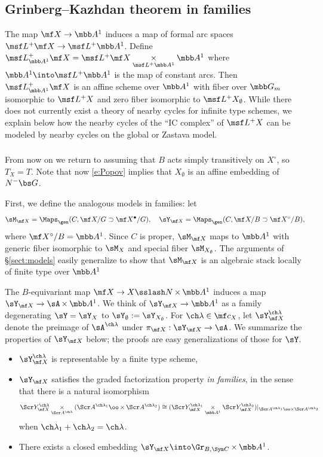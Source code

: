 \documentclass[final]{amsart}
\theoremstyle{remark}
\theoremstyle{definition}
\DeclareMathOperator*{\xt}{\times}
\numberwithin{equation}{section}
\begin{document}
\subsection{Grinberg--Kazhdan theorem in families}
The map $\mf X \to \mbb A^1$ 
induces a map of formal arc spaces $\msf L^+ \mf X \to \msf L^+ \mbb A^1$. Define
$\msf L^+_{\mbb A^1} \mf X = \msf L^+ \mf X \underset{\msf L^+ \mbb A^1}\times \mbb A^1$
where $\mbb A^1 \into \msf L^+ \mbb A^1$ is the map of constant
arcs. Then $\msf L^+_{\mbb A^1} \mf X$ is an affine scheme over $\mbb A^1$
with fiber over $\mbb G_m$ isomorphic to $\msf L^+X$ and zero fiber isomorphic to 
$\msf L^+ X_\emptyset$. 
While there does not currently exist a theory of nearby cycles for infinite type
schemes, we explain below how the nearby cycles of the ``IC complex'' of 
$\msf L^+ X$ can be modeled by nearby cycles on the global or Zastava model. 


\subsubsection{}
From now on we return to assuming that $B$ acts simply transitively on $X^\circ$, 
so $T_X=T$. Note that now \eqref{e:Popov} implies that $X_\emptyset$ is an 
affine embedding of $N^-\bs G$. 

\smallskip


First, we define the analogous models in families: let 
\[ \sM_{\mf X} = \Maps_\gen(C, \mf X/G \supset \mf X^\bullet/G), \quad 
\sY_{\mf X} = \Maps_\gen(C, \mf X/B \supset \mf X^\circ/B), \]
where $\mf X^\circ/B = \mbb A^1$.  
Since $C$ is proper, $\sM_{\mf X}$ maps to $\mbb A^1$ 
with generic fiber isomorphic to $\sM_X$ and special fiber $\sM_{X_\emptyset}$.
The arguments of \S\ref{sect:models} easily generalize to
show that $\sM_{\mf X}$ is an algebraic stack locally of finite type over $\mbb A^1$

The $B$-equivariant map $\mf X \to X\sslash N \xt \mbb A^1$ induces
a map $\sY_{\mf X} \to \sA \xt \mbb A^1$. We think of $\sY_{\mf X}\to \mbb A^1$
as a family degenerating $\sY=\sY_X$ to $\sY_\emptyset := \sY_{X_\emptyset}$. 
For $\ch\lambda\in \mf c_X$, let $\sY_{\mf X}^{\ch\lambda}$
denote the preimage of $\sA^{\ch\lambda}$ under $\pi_{\mf X} : \sY_{\mf X} \to \sA$.
We summarize the properties of $\sY_{\mf X}$ below; the proofs
are easy generalizations of those for $\sY$. 
\begin{itemize}
\item $\sY_{\mf X}^{\ch\lambda}$ is representable by a finite type scheme,
\item $\sY_{\mf X}$ satisfies the graded factorization property \emph{in families},
in the sense that there is a natural isomorphism 
\[ 
\Scr Y_{\mf X}^{\ch\lambda} \underset{\Scr A^{\ch\lambda}}\times 
(\Scr A^{\ch\lambda_1} \oo\xt \Scr A^{\ch\lambda_2}) 
\cong 
(\Scr Y_{\mf X}^{\ch\lambda_1} \underset{\mbb A^1}\times \Scr Y_{\mf X}^{\ch\lambda_2})|_{\Scr A^{\ch\lambda_1}\oo\times \Scr A^{\ch\lambda_2}} 
\]
when $\ch\lambda_1+\ch\lambda_2=\ch\lambda$.
\item There exists a closed embedding $\sY_{\mf X} \into \Gr_{B,\Sym C} \xt \mbb A^1$. 
\end{itemize}
\end{document}

